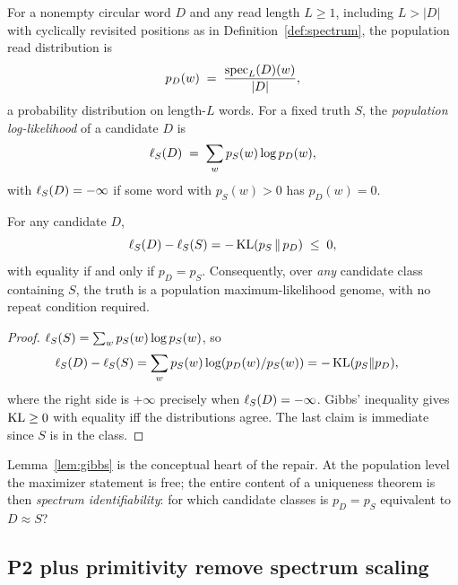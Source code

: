 \begin{definition}
\label{def:population}
For a nonempty circular word $D$ and any read length $L\ge1$,
including $L>|D|$ with cyclically revisited positions as in
Definition~\ref{def:spectrum}, the population read distribution is
\[
  p_D(w) \;=\; \frac{\operatorname{spec}_L(D)(w)}{|D|},
\]
a probability distribution on length-$L$ words. For a fixed truth $S$, the
\emph{population log-likelihood} of a candidate $D$ is
\[
  \ell_S(D) \;=\; \sum_{w} p_S(w)\log p_D(w),
\]
with $\ell_S(D)=-\infty$ if some word with $p_S(w)>0$ has $p_D(w)=0$.
\end{definition}

\begin{lemma}
\label{lem:gibbs}
For any candidate $D$,
\[
  \ell_S(D)-\ell_S(S) = -\operatorname{KL}(p_S\,\|\,p_D) \;\le\; 0,
\]
with equality if and only if $p_D=p_S$. Consequently, over \emph{any} candidate
class containing $S$, the truth is a population maximum-likelihood genome, with
no repeat condition required.
\end{lemma}

\begin{proof}
$\ell_S(S)=\sum_w p_S(w)\log p_S(w)$, so
\begin{align*}
  \ell_S(D)-\ell_S(S)
    &=\sum_w p_S(w)\log(p_D(w)/p_S(w))=-\operatorname{KL}(p_S\|p_D),
\end{align*}
where the right side is $+\infty$ precisely when $\ell_S(D)=-\infty$. Gibbs'
inequality \parencite{cover2006} gives $\operatorname{KL}\ge0$ with equality iff the distributions
agree. The last claim is immediate since $S$ is in the class.
\end{proof}

Lemma~\ref{lem:gibbs} is the conceptual heart of the repair. At the population
level the maximizer statement is free; the entire content of a uniqueness theorem
is then \emph{spectrum identifiability}: for which candidate classes is
$p_D=p_S$ equivalent to $D\approx S$?

\subsection{P2 plus primitivity remove spectrum scaling}

